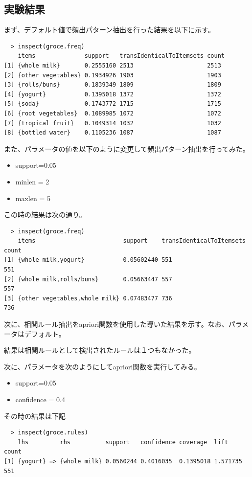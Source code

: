 \documentclass[dvipdfmx]{jsarticle}
\begin{document}
\subsection{実験結果}
まず、デフォルト値で頻出パターン抽出を行った結果を以下に示す。
\begin{verbatim}
  > inspect(groce.freq)
    items              support   transIdenticalToItemsets count
[1] {whole milk}       0.2555160 2513                     2513
[2] {other vegetables} 0.1934926 1903                     1903
[3] {rolls/buns}       0.1839349 1809                     1809
[4] {yogurt}           0.1395018 1372                     1372
[5] {soda}             0.1743772 1715                     1715
[6] {root vegetables}  0.1089985 1072                     1072
[7] {tropical fruit}   0.1049314 1032                     1032
[8] {bottled water}    0.1105236 1087                     1087
\end{verbatim}
また、パラメータの値を以下のように変更して頻出パターン抽出を行ってみた。
\begin{itemize}
  \item support=0.05
  \item minlen = 2
  \item maxlen = 5
\end{itemize}
この時の結果は次の通り。
\begin{verbatim}
  > inspect(groce.freq)
    items                         support    transIdenticalToItemsets count
[1] {whole milk,yogurt}           0.05602440 551                      551
[2] {whole milk,rolls/buns}       0.05663447 557                      557
[3] {other vegetables,whole milk} 0.07483477 736                      736
\end{verbatim}
次に、相関ルール抽出をapriori関数を使用した導いた結果を示す。なお、パラメータはデフォルト。\par
結果は相関ルールとして検出されたルールは１つもなかった。\par
次に、パラメータを次のようにしてapriori関数を実行してみる。
\begin{itemize}
  \item support=0.05
  \item confidence = 0.4
\end{itemize}
その時の結果は下記
\begin{verbatim}
  > inspect(groce.rules)
    lhs         rhs          support   confidence coverage  lift     count
[1] {yogurt} => {whole milk} 0.0560244 0.4016035  0.1395018 1.571735 551
\end{verbatim}
\end{document}
